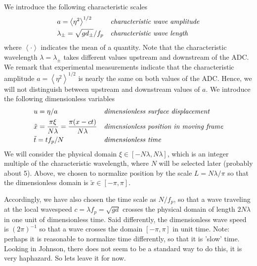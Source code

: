 \documentclass[11pt]{article}
\newcommand{\mean}[1]{\left< #1 \right>}
\newcommand{\freqp}{f_p}
\newcommand{\amp}{a}
\newcommand{\depth}{d}
\newcommand{\dupdn}{\depth_{\pm}}
\newcommand{\lam}{\lambda}
\newcommand{\lamupdn}{\lam_{\pm}}
\newcommand{\lamfac}{N}
\begin{document}
We introduce the following characteristic scales
\begin{align}
\label{ampdefn}
&\amp = \mean{\eta^2}^{1/2} 
&&\mbox{\em characteristic wave amplitude} \\
\label{lamdefn}
&\lamupdn = \sqrt{g \dupdn} / \freqp
&&\mbox{\em characteristic wave length}
\end{align}
where $\mean{\cdot}$ indicates the mean of a quantity. Note that the characteristic wavelength $\lam = \lamupdn$ takes different values upstream and downstream of the ADC. We remark that experimental measurements indicate that the characteristic amplitude $\amp = \mean{\eta^2}^{1/2}$ is nearly the same on both values of the ADC. Hence, we will not distinguish between upstream and downstream values of $\amp$.
We introduce the following dimensionless variables
\begin{align}
&u = \eta/\amp
&&\mbox{\em dimensionless surface displacement} \\
&\tilde{x} = \frac{\pi \xi}{\lamfac \lam} = \frac{\pi (x-ct)}{\lamfac \lam}
&&\mbox{\em dimensionless position in moving frame} \\
& \tilde{t} = t \freqp / \lamfac
&&\mbox{\em dimensionless time}
\end{align}
We will consider the physical domain $\xi \in [-\lamfac \lam, \lamfac \lam]$, which is an integer multiple of the characteristic wavelength, where $\lamfac$ will be selected later (probably about 5). Above, we chosen to normalize position by the scale $L = \lamfac \lam/\pi$ so that the dimensionless domain is $\tilde{x} \in [-\pi,\pi]$. 

Accordingly, we have also chosen the time scale as $\lamfac/\freqp$, so that a wave traveling at the local wavespeed $c = \lam \freqp = \sqrt{g \depth}$ crosses the physical domain of length $2 \lamfac \lam$ in one unit of dimensionless time. Said differently, the dimensionless wave speed is $(2 \pi)^{-1}$ so that a wave crosses the domain $[-\pi,\pi]$ in unit time. Note: perhaps it is reasonable to normalize time differently, so that it is 'slow' time. Looking in Johnson, there does not seem to be a standard way to do this, it is very haphazard. So lets leave it for now. 
\end{document}
